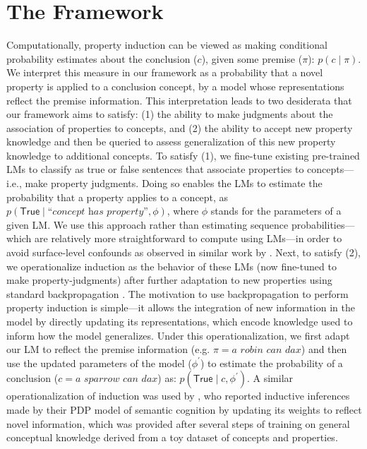 \documentclass[10pt,letterpaper]{article}
\newcommand{\true}{\mathsf{True}}
\begin{document}
\section{The Framework}
Computationally, property induction can be viewed as making conditional probability estimates about the conclusion ($c$), given some premise ($\pi$): $p(c\mid\pi)$.
We interpret this measure in our framework as a probability that a novel property is applied to a conclusion concept, by a model whose representations reflect the premise information.
This interpretation leads to two desiderata that our framework aims to satisfy: (1) the ability to make judgments about the association of properties to concepts, and (2) the ability to accept new property knowledge and then be queried to assess generalization of this new property knowledge to additional concepts.
To satisfy (1), we fine-tune existing pre-trained LMs to classify as true or false sentences that associate properties to concepts---i.e., make property judgments. Doing so enables the LMs to estimate the probability that a property applies to a concept, as $p(\true \mid \textit{``concept has property''}, \phi)$, where $\phi$ stands for the parameters of a given LM. 
We use this approach rather than estimating sequence probabilities---which are relatively more straightforward to compute using LMs---in order to avoid surface-level confounds as observed in similar work by \citet{misra2021typicality}.
Next, to satisfy (2), we operationalize induction as the behavior of these LMs (now fine-tuned to make property-judgments) after further adaptation to new properties using standard backpropagation \citep{rumelhart1986learning}. 
The motivation to use backpropagation to perform property induction is simple---it allows the integration of new information in the model by directly updating its representations, which encode knowledge used to inform how the model generalizes.
Under this operationalization, we first adapt our LM to reflect the premise information (e.g. $\pi = \textit{a robin can dax}$) and then use the updated parameters of the model ($\phi^{\prime}$) to estimate the probability of a conclusion ($c = \textit{a sparrow can dax}$) as: $p(\true \mid c, \phi^{\prime})$.
A similar operationalization of induction was used by \citet{rogers2004semantic}, who reported inductive inferences made by their PDP model of semantic cognition by updating its weights to reflect novel information, which was provided after several steps of training on general conceptual knowledge derived from a toy dataset  of concepts and properties.
\end{document}
